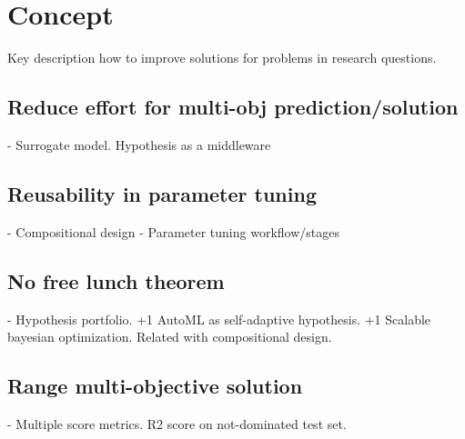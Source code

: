\chapter{Concept}
Key description how to improve solutions for problems in research questions.

    \section{Reduce effort for multi-obj prediction/solution}
        - Surrogate model. Hypothesis as a middleware

    \section{Reusability in parameter tuning}
        - Compositional design
        - Parameter tuning workflow/stages 

    \section{No free lunch theorem}
        - Hypothesis portfolio. +1 AutoML as self-adaptive hypothesis. +1 Scalable bayesian optimization. Related with compositional design.

    \section{Range multi-objective solution}
        - Multiple score metrics. R2 score on not-dominated test set.

